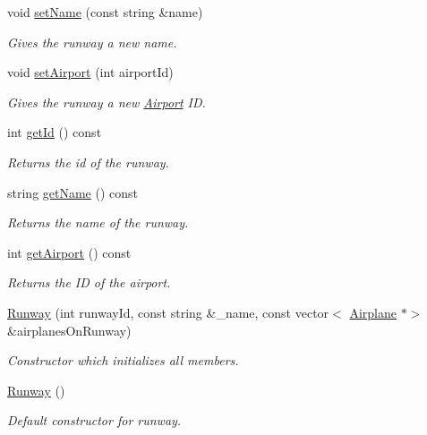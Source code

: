 \begin{DoxyCompactItemize}
void \mbox{\hyperlink{class_runway_ab601d0a69ecffc0042d69cf0eb0cdaba}{set\+Name}} (const string \&name)
\begin{DoxyCompactList}\small\item\em Gives the runway a new name. \end{DoxyCompactList}\item 
void \mbox{\hyperlink{class_runway_a6614626321a1f4c33f24800cbe78d330}{set\+Airport}} (int airport\+Id)
\begin{DoxyCompactList}\small\item\em Gives the runway a new \mbox{\hyperlink{class_airport}{Airport}} ID. \end{DoxyCompactList}\item 
int \mbox{\hyperlink{class_runway_afd718b92fbf2bdcbdc5c3da48a76c7af}{get\+Id}} () const
\begin{DoxyCompactList}\small\item\em Returns the id of the runway. \end{DoxyCompactList}\item 
string \mbox{\hyperlink{class_runway_a525e4c94639bde05c335492d5229f882}{get\+Name}} () const
\begin{DoxyCompactList}\small\item\em Returns the name of the runway. \end{DoxyCompactList}\item 
int \mbox{\hyperlink{class_runway_ac6d84fd93863115c2b96912b4432d76e}{get\+Airport}} () const
\begin{DoxyCompactList}\small\item\em Returns the ID of the airport. \end{DoxyCompactList}\item 
\mbox{\hyperlink{class_runway_a9907eac3d79e7a4bddd8b00bf1a15bce}{Runway}} (int runway\+Id, const string \&\+\_\+name, const vector$<$ \mbox{\hyperlink{class_airplane}{Airplane}} $\ast$$>$ \&airplanes\+On\+Runway)
\begin{DoxyCompactList}\small\item\em Constructor which initializes all members. \end{DoxyCompactList}\item 
\mbox{\hyperlink{class_runway_a75b9355b4953bd430f7c6ea0a18b465a}{Runway}} ()
\begin{DoxyCompactList}\small\item\em Default constructor for runway. \end{DoxyCompactList}\end{DoxyCompactItemize}


